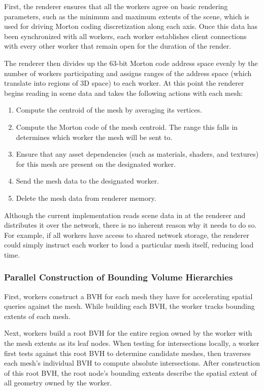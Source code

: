 \documentclass[a4paper,twoside]{article}
\begin{document}
First, the renderer ensures that all the workers agree on basic rendering
parameters, such as the minimum and maximum extents of the scene, which is used
for driving Morton coding discretization along each axis. Once this data has
been synchronized with all workers, each worker establishes client connections
with every other worker that remain open for the duration of the render.

The renderer then divides up the 63-bit Morton code address space evenly by the
number of workers participating and assigns ranges of the address space (which
translate into regions of 3D space) to each worker. At this point the renderer
begins reading in scene data and takes the following actions with each mesh:

\begin{enumerate}
    \item Compute the centroid of the mesh by averaging its vertices.
    \item Compute the Morton code of the mesh centroid. The range this falls in
        determines which worker the mesh will be sent to.
    \item Ensure that any asset dependencies (such as materials, shaders, and
        textures) for this mesh are present on the designated worker.
    \item Send the mesh data to the designated worker.
    \item Delete the mesh data from renderer memory.
\end{enumerate}

Although the current implementation reads scene data in at the renderer
and distributes it over the network, there is no inherent reason why it needs
to do so. For example, if all workers have access to shared network storage,
the renderer could simply instruct each worker to load a particular mesh itself,
reducing load time.

\subsubsection{Parallel Construction of Bounding Volume Hierarchies}
\label{parallelbvh}

First, workers construct a BVH for each mesh they have for accelerating spatial
queries against the mesh. While building each BVH, the worker tracks bounding
extents of each mesh.

Next, workers build a root BVH for the entire region owned by the worker with
the mesh extents as its leaf nodes. When testing for intersections locally, a
worker first tests against this root BVH to determine candidate meshes, then
traverses each mesh's individual BVH to compute absolute intersections. After
construction of this root BVH, the root node's bounding extents describe the
spatial extent of all geometry owned by the worker.
\end{document}
